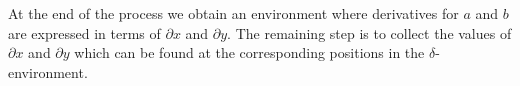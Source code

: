 {At the end of the process we obtain an environment where derivatives for $a$ and
$b$ are expressed in terms of $\partial{x}$ and $\partial{y}$.  The remaining step
is to collect the values of $\partial{x}$ and $\partial{y}$ which can be found
at the corresponding positions in the $\delta$-environment.
\begin{code}[hide]%
%
\>[2]\AgdaSpace{}%
\AgdaSpace{}%
\AgdaSymbol{:}\AgdaSpace{}%
\AgdaSpace{}%
\<%
\\
\>[2][@{}l@{\AgdaIndent{0}}]%
\>[4]\AgdaInductiveConstructor{[]}%
\>[8]\AgdaSymbol{:}\AgdaSpace{}%
\<%
\\
%
\>[4]\AgdaSpace{}%
\AgdaSymbol{:}\AgdaSpace{}%
\AgdaSpace{}%
\AgdaSpace{}%
\AgdaSpace{}%
\AgdaSpace{}%
\<%
\\
%
\\[\AgdaEmptyExtraSkip]%
%
\>[2]\AgdaOperator{\AgdaFunction{\AgdaUnderscore{}<><\AgdaUnderscore{}}}\AgdaSpace{}%
\AgdaSymbol{:}\AgdaSpace{}%
\AgdaSpace{}%
\AgdaSpace{}%
\AgdaSpace{}%
\AgdaSpace{}%
\<%
\\
%
\>[2]\AgdaSpace{}%
\AgdaOperator{\AgdaFunction{<><}}\AgdaSpace{}%
\AgdaInductiveConstructor{[]}\AgdaSpace{}%
\AgdaSymbol{=}\AgdaSpace{}%
\<%
\\
%
\>[2]\AgdaSpace{}%
\AgdaOperator{\AgdaFunction{<><}}\AgdaSpace{}%
\AgdaSymbol{(}\AgdaSpace{}%
\AgdaSpace{}%
\AgdaSymbol{)}\AgdaSpace{}%
\AgdaSymbol{=}\AgdaSpace{}%
\AgdaSymbol{(}\AgdaSpace{}%
\AgdaSpace{}%
\AgdaSymbol{)}\AgdaSpace{}%
\AgdaOperator{\AgdaFunction{<><}}\AgdaSpace{}%
\<%
\\
%
\\[\AgdaEmptyExtraSkip]%
%
\>[2]\AgdaSpace{}%
\AgdaSpace{}%
\AgdaSymbol{:}\AgdaSpace{}%
\AgdaSpace{}%
\AgdaSpace{}%
\AgdaSpace{}%
\AgdaSpace{}%
\AgdaSpace{}%
\<%
\\
\>[2][@{}l@{\AgdaIndent{0}}]%
\>[4]\AgdaInductiveConstructor{[]}%
\>[8]\AgdaSymbol{:}\AgdaSpace{}%

\end{code}}

